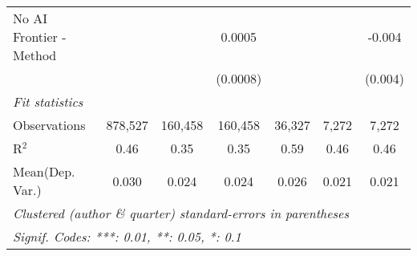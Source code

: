 \begin{tabular}{lcccccc}
   No AI Frontier - Method &               &              & 0.0005        &              &         & -0.004\\   
                           &               &              & (0.0008)      &              &         & (0.004)\\   
   \midrule
   \emph{Fit statistics}\\
   Observations            & 878,527       & 160,458      & 160,458       & 36,327       & 7,272   & 7,272\\  
   R$^2$                   & 0.46          & 0.35         & 0.35          & 0.59         & 0.46    & 0.46\\  
Mean(Dep. Var.) & 0.030 & 0.024 & 0.024 & 0.026 & 0.021 & 0.021 \\
   \midrule \midrule
   \multicolumn{7}{l}{\emph{Clustered (author \& quarter) standard-errors in parentheses}}\\
   \multicolumn{7}{l}{\emph{Signif. Codes: ***: 0.01, **: 0.05, *: 0.1}}\\
\end{tabular}
\par\endgroup

